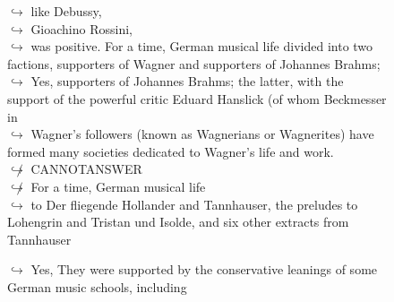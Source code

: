 \documentclass[11pt,a4paper, onecolumn]{article}
\begin{document}
\begin{figure}[t] \small \begin{tcolorbox}[boxsep=0pt,left=5pt,right=0pt,top=2pt,colback = yellow!5] \begin{dialogue}
 \small 
\colorbox{pink!25}{$\hookrightarrow$}
{ like Debussy, }
\\
\colorbox{pink!25}{$\hookrightarrow$}
{ Gioachino Rossini, }
\\
\colorbox{pink!25}{$\hookrightarrow$}
{ was positive. For a time, German musical life divided into two factions, supporters of Wagner and supporters of Johannes Brahms; }
\\
\colorbox{pink!25}{$\hookrightarrow$}
\colorbox{red!25}{Yes,}
{ supporters of Johannes Brahms; the latter, with the support of the powerful critic Eduard Hanslick (of whom Beckmesser in }
\\
\colorbox{pink!25}{$\hookrightarrow$}
{ Wagner's followers (known as Wagnerians or Wagnerites) have formed many societies dedicated to Wagner's life and work. }
\\
\colorbox{pink!25}{$\not\hookrightarrow$}
{ CANNOTANSWER }
\\
\colorbox{pink!25}{$\not\hookrightarrow$}
{ For a time, German musical life }
\\
\colorbox{pink!25}{$\hookrightarrow$}
{ to Der fliegende Hollander and Tannhauser, the preludes to Lohengrin and Tristan und Isolde, and six other extracts from Tannhauser }
 \end{dialogue}\end{tcolorbox}\end{figure}\begin{figure}[t] \small \begin{tcolorbox}[boxsep=0pt,left=5pt,right=0pt,top=2pt,colback = yellow!5] \begin{dialogue}
 \small 
\colorbox{pink!25}{$\hookrightarrow$}
\colorbox{red!25}{Yes,}
{ They were supported by the conservative leanings of some German music schools, including }

\end{dialogue}
\end{tcolorbox}
\end{figure}
\end{document}
